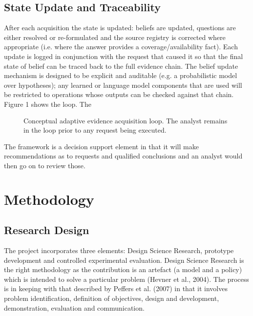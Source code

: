 \documentclass[a4paper,11pt]{article}
\begin{document}
\subsection{State Update and Traceability}
After each acquisition the state is updated: beliefs are updated, questions are either resolved or re-formulated and the source registry is corrected where appropriate (i.e. where the answer provides a coverage/availability fact). Each update is logged in conjunction with the request that caused it so that the final state of belief can be traced back to the full evidence chain. The belief update mechanism is designed to be explicit and auditable (e.g. a probabilistic model over hypotheses); any learned or language model components that are used will be restricted to operations whose outputs can be checked against that chain. Figure 1 shows the loop. The\par
\begin{figure}[htbp]\centering
{}
\caption{Conceptual adaptive evidence acquisition loop. The analyst remains in the loop prior to any request being executed.}
\end{figure}
The framework is a decision support element in that it will make recommendations as to requests and qualified conclusions and an analyst would then go on to review those.\par
\section{Methodology}
\subsection{Research Design}
The project incorporates three elements: Design Science Research, prototype development and controlled experimental evaluation. Design Science Research is the right methodology as the contribution is an artefact (a model and a policy) which is intended to solve a particular problem (Hevner et al., 2004). The process is in keeping with that described by Peffers et al. (2007) in that it involves problem identification, definition of objectives, design and development, demonstration, evaluation and communication.\par
\end{document}
